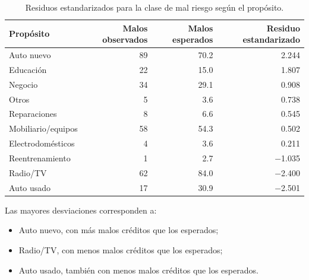 \begin{table}[H]
    \centering
    \caption{Residuos estandarizados para la clase de mal riesgo según
    el propósito.}
    \label{tab:residuos-proposito}

    \begin{tabular}{
        @{}
        l
        r
        r
        r
        @{}
    }
        \toprule
        Propósito
        & Malos observados
        & Malos esperados
        & Residuo estandarizado \\
        \midrule

        Auto nuevo
        & 89
        & \num{70.2}
        & \num{2.244} \\

        Educación
        & 22
        & \num{15.0}
        & \num{1.807} \\

        Negocio
        & 34
        & \num{29.1}
        & \num{0.908} \\

        Otros
        & 5
        & \num{3.6}
        & \num{0.738} \\

        Reparaciones
        & 8
        & \num{6.6}
        & \num{0.545} \\

        Mobiliario/equipos
        & 58
        & \num{54.3}
        & \num{0.502} \\

        Electrodomésticos
        & 4
        & \num{3.6}
        & \num{0.211} \\

        Reentrenamiento
        & 1
        & \num{2.7}
        & \num{-1.035} \\

        Radio/TV
        & 62
        & \num{84.0}
        & \num{-2.400} \\

        Auto usado
        & 17
        & \num{30.9}
        & \num{-2.501} \\

        \bottomrule
    \end{tabular}
\end{table}

Las mayores desviaciones corresponden a:

\begin{itemize}
    \item Auto nuevo, con más malos créditos que los esperados;

    \item Radio/TV, con menos malos créditos que los esperados;

    \item Auto usado, también con menos malos créditos que los
    esperados.
\end{itemize}

